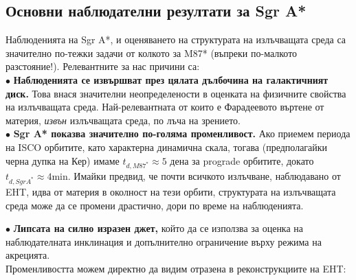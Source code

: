 \subsection{Основни наблюдателни резултати за Sgr A*}

Наблюденията на Sgr A*, и оценяването на структурата на излъчващата среда са значително по-тежки задачи от колкото за M87* (въпреки по-малкото разстояние!). Релевантните за нас причини са:\\\newline
$\bullet$ \textbf{Наблюденията се извършват през цялата дълбочина на галактичният диск.} Това внася значителни неопределености в оценката на физичните свойства на излъчващата среда. Най-релевантната от които е Фарадеевото въртене от материя, \emph{извън} излъчващата среда, по лъча на зрението.\\\newline
$\bullet$ \textbf{Sgr A* показва значително по-голяма променливост.} Ако приемем периода на ISCO орбитите, като характерна динамична скала, тогава (предполагайки черна дупка на Кер) имаме $t_{d,M87^*} \approx 5 $ дена за prograde орбитите, докато $t_{d,Sgr A^*}\approx 4 \text{min}$. Имайки предвид, че почти всичкото излъчване, наблюдавано от EHT, идва от материя в околност на тези орбити, структурата на излъчващата среда може да се промени драстично, дори по време на наблюденията. \newpage

\noindent$\bullet$ \textbf{Липсата на силно изразен джет,} който да се използва за оценка на наблюдателната инклинация и допълнително ограничение върху режима на акрецията.\\\newline
Променливостта можем директно да видим отразена в реконструкциите на EHT:\\

